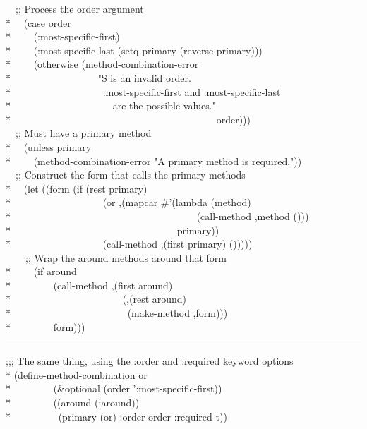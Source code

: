 \begin{defmac}
\begin{lisp}
~~;; Process the order argument \\*
~~(case order \\*
~~~~(:most-specific-first) \\*
~~~~(:most-specific-last (setq primary (reverse primary))) \\*
~~~~(otherwise (method-combination-error \\*
~~~~~~~~~~~~~~~~~"{\Xtilde}S is an invalid order.{\Xtilde}{\Xatsign} \\*
~~~~~~~~~~~~~~~~~~:most-specific-first and :most-specific-last {\Xtilde} \\*
~~~~~~~~~~~~~~~~~~~~are the possible values." \\*
~~~~~~~~~~~~~~~~~~~~~~~~~~~~~~~~~~~~~~~~~order))) \\
~~;; Must have a primary method \\*
~~(unless primary \\*
~~~~(method-combination-error "A primary method is required.")) \\
~~;; Construct the form that calls the primary methods \\*
~~(let ((form (if (rest primary) \\*
~~~~~~~~~~~~~~~~~~{\Xbq}(or ,{\Xatsign}(mapcar \#'(lambda (method) \\*
~~~~~~~~~~~~~~~~~~~~~~~~~~~~~~~~~~~~~{\Xbq}(call-method ,method ())) \\*
~~~~~~~~~~~~~~~~~~~~~~~~~~~~~~~~~primary)) \\*
~~~~~~~~~~~~~~~~~~{\Xbq}(call-method ,(first primary) ())))) \\
~~~~;; Wrap the around methods around that form \\*
~~~~(if around \\*
~~~~~~~~{\Xbq}(call-method ,(first around) \\*
~~~~~~~~~~~~~~~~~~~~~~(,{\Xatsign}(rest around) \\*
~~~~~~~~~~~~~~~~~~~~~~~(make-method ,form))) \\*
~~~~~~~~form)))
\end{lisp}
\hrule width 0pt\relax
\begin{lisp}
;;; The same thing, using the :order and :required keyword options \\*
(define-method-combination or  \\*
~~~~~~~~(\&optional (order ':most-specific-first)) \\*
~~~~~~~~((around (:around)) \\*
~~~~~~~~~(primary (or) :order order :required t)) \\

\end{lisp}
\end{defmac}
